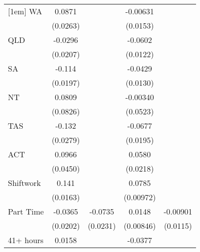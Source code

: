 {\begin{tabular}{l*{4}{c}}
[1em]
WA                  &      0.0871\sym{***}&                     &    -0.00631         &                     \\
                    &    (0.0263)         &                     &    (0.0153)         &                     \\
[1em]
QLD                 &     -0.0296         &                     &     -0.0602\sym{***}&                     \\
                    &    (0.0207)         &                     &    (0.0122)         &                     \\
[1em]
SA                  &      -0.114\sym{***}&                     &     -0.0429\sym{**} &                     \\
                    &    (0.0197)         &                     &    (0.0130)         &                     \\
[1em]
NT                  &      0.0809         &                     &    -0.00340         &                     \\
                    &    (0.0826)         &                     &    (0.0523)         &                     \\
[1em]
TAS                 &      -0.132\sym{***}&                     &     -0.0677\sym{***}&                     \\
                    &    (0.0279)         &                     &    (0.0195)         &                     \\
[1em]
ACT                 &      0.0966\sym{*}  &                     &      0.0580\sym{**} &                     \\
                    &    (0.0450)         &                     &    (0.0218)         &                     \\
[1em]
Shiftwork           &       0.141\sym{***}&                     &      0.0785\sym{***}&                     \\
                    &    (0.0163)         &                     &   (0.00972)         &                     \\
[1em]
Part Time           &     -0.0365         &     -0.0735\sym{**} &      0.0148         &    -0.00901         \\
                    &    (0.0202)         &    (0.0231)         &   (0.00846)         &    (0.0115)         \\
[1em]
41+ hours           &      0.0158         &                     &     -0.0377\sym{**} &                     \\

\end{tabular}}
